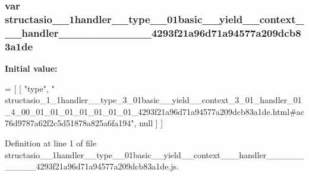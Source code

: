 \subsubsection[{structasio\+\_\+1\+\_\+1handler\+\_\+\+\_\+type\+\_\+3\+\_\+01basic\+\_\+\+\_\+yield\+\_\+\+\_\+context\+\_\+3\+\_\+01\+\_\+handler\+\_\+01\+\_\+4\+\_\+00\+\_\+01\+\_\+01\+\_\+01\+\_\+01\+\_\+01\+\_\+01\+\_\+01\+\_\+4293f21a96d71a94577a209dcb83a1de}]{\setlength{\rightskip}{0pt plus 5cm}var structasio\+\_\+\_\+1handler\+\_\+\+\_\+type\+\_\+\_\+01basic\+\_\+\+\_\+yield\+\_\+\+\_\+context\+\_\+\_\+\_\+handler\+\_\+\_\+\_\+\_\+\_\+\_\+\_\+\_\+\_\+\_\+\_\+4293f21a96d71a94577a209dcb83a1de}\label{structasio__1__1handler____type__3__01basic____yield____context__3__01__handler__01__4__00__01__f15ff47d30f1cfeae33bcea3e258896e_a0cc870110f2c9387299d42ad138ce4fa}
{\bfseries Initial value\+:}
\begin{DoxyCode}
=
[
    [ \textcolor{stringliteral}{"type"}, \textcolor{stringliteral}{"
      structasio\_1\_1handler\_\_type\_3\_01basic\_\_yield\_\_context\_3\_01\_handler\_01\_4\_00\_01\_01\_01\_01\_01\_01\_01\_4293f21a96d71a94577a209dcb83a1de.html#ac76d9787a62f2c5d51878a825a6fa194"}, null ]
]
\end{DoxyCode}


Definition at line 1 of file structasio\+\_\+\_\+1handler\+\_\+\+\_\+type\+\_\+\_\+01basic\+\_\+\+\_\+yield\+\_\+\+\_\+context\+\_\+\_\+\_\+handler\+\_\+\_\+\_\+\_\+\_\+\_\+\_\+\_\+\_\+\_\+\_\+4293f21a96d71a94577a209dcb83a1de.\+js.

